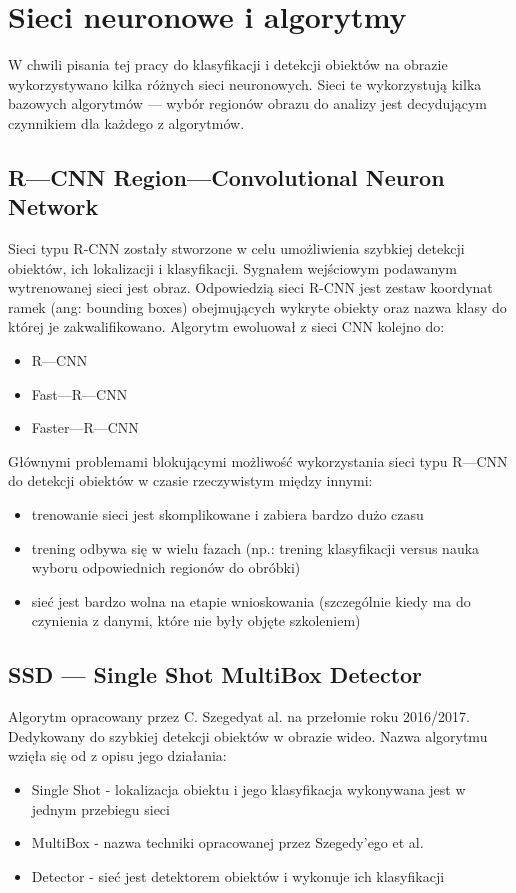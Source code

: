 \section{Sieci neuronowe i algorytmy}

W chwili pisania tej pracy do klasyfikacji i detekcji obiektów na obrazie wykorzystywano kilka różnych sieci neuronowych. Sieci te wykorzystują kilka bazowych algorytmów --- wybór regionów obrazu do analizy jest decydującym czynnikiem dla każdego z algorytmów.
 
\subsection{R---CNN Region---Convolutional Neuron Network}

Sieci typu R-CNN zostały stworzone w celu umożliwienia szybkiej detekcji obiektów, ich lokalizacji i klasyfikacji. Sygnałem wejściowym podawanym wytrenowanej sieci jest obraz. Odpowiedzią sieci R-CNN jest zestaw koordynat ramek (ang: bounding boxes) obejmujących wykryte obiekty oraz nazwa klasy do której je zakwalifikowano. Algorytm ewoluował z sieci CNN kolejno do:
\begin{itemize}
	\item R---CNN
	\item Fast---R---CNN
	\item Faster---R---CNN
\end{itemize}

Głównymi problemami blokującymi możliwość wykorzystania sieci typu R---CNN do detekcji obiektów w czasie rzeczywistym między innymi:
\begin{itemize}
	\item trenowanie sieci jest skomplikowane i zabiera bardzo dużo czasu
	\item trening odbywa się w wielu fazach (np.: trening klasyfikacji versus nauka wyboru odpowiednich regionów do obróbki)
	\item sieć jest bardzo wolna na etapie wnioskowania (szczególnie kiedy ma do czynienia z danymi, które nie były objęte szkoleniem)
\end{itemize}

\subsection{SSD --- Single Shot MultiBox Detector}
Algorytm opracowany przez C. Szegedyat al.\cite{DBLP:journals/corr/LiuAESR15} na przełomie roku 2016/2017. Dedykowany do szybkiej detekcji obiektów w obrazie wideo. Nazwa algorytmu wzięła się od z opisu jego działania:
\begin{itemize}
	\item Single Shot - lokalizacja obiektu i jego klasyfikacja wykonywana jest w jednym przebiegu sieci
	\item MultiBox - nazwa techniki opracowanej przez Szegedy'ego et al. 
	\item Detector - sieć jest detektorem obiektów i wykonuje ich klasyfikacji
\end{itemize}

